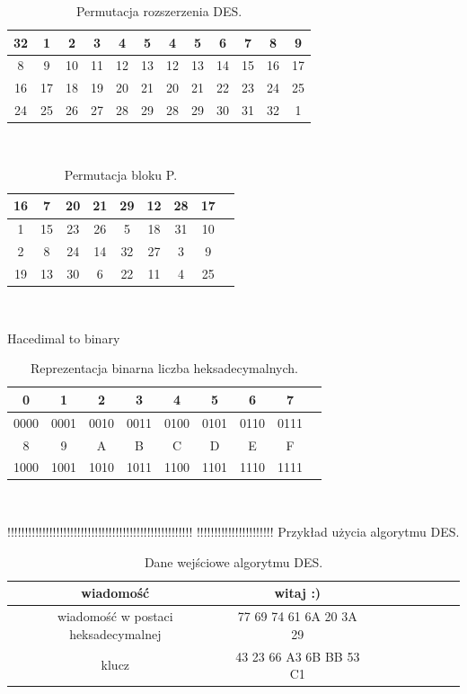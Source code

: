 \documentclass[12p]{article}
\begin{document}
\begin{table}[!h]
\centering
\begin{tabular}{|c|c|c|c|c|c|c|c|c|c|c|c|}
\hline
32 & 1 & 2 & 3 & 4 & 5 & 4 & 5 & 6 & 7 & 8 & 9\\
\hline
8 & 9 & 10 & 11 & 12 & 13 & 12 & 13 & 14 & 15 & 16 & 17\\
\hline
16 & 17 & 18 & 19 & 20 & 21 & 20 & 21 & 22 & 23 & 24 & 25\\
\hline
24 & 25 & 26 & 27 & 28 & 29 & 28 & 29 & 30 & 31 & 32 & 1\\
\hline
\end{tabular}
\caption{Permutacja rozszerzenia DES.}~\label{per_rozszerzenia}
\end{table}

\begin{table}[!h]
\centering
\begin{tabular}{|c|c|c|c|c|c|c|c|c|}
\hline
16 &	7 &	20& 	21& 	29& 	12& 	28& 	17\\ \hline
1 &	15& 	23& 	26& 	5& 	18& 	31& 	10\\ \hline
2 &	8 &	24 &	14& 	32& 	27& 	3 &	9\\ \hline
19 	&13 &	30& 	6& 	22& 	11& 	4& 	25\\ \hline
\end{tabular}
\caption{Permutacja bloku P.}~\label{blok_P}
\end{table}

Hacedimal to binary

\begin{table}[!h]
\centering
\begin{tabular}{|c|c|c|c|c|c|c|c|c|}
\hline
0 & 1 & 2 & 3 & 4 & 5 & 6 & 7\\
\hline
0000 & 0001 & 0010 & 0011 & 0100 & 0101 & 0110 & 0111\\
\hline
8 & 9 & A & B & C & D & E & F\\
\hline
1000 & 1001 & 1010 & 1011 & 1100 & 1101 & 1110 & 1111\\
\hline
\end{tabular}
\caption{Reprezentacja binarna liczba heksadecymalnych.}~\label{binary}
\end{table}



!!!!!!!!!!!!!!!!!!!!!!!!!!!!!!!!!!!!!!!!!!!!!!!!!!!!!
!!!!!!!!!!!!!!!!!!!!!!  Przykład użycia algorytmu DES.
 
\begin{table}[!h]
\centering
\begin{tabular}{|c|c|c|c|c|c|c|c|c|}
\hline
wiadomość & witaj :)\\
\hline
wiadomość w postaci heksadecymalnej & 77 69 74 61 6A 20 3A 29\\
\hline
klucz & 43 23 66 A3 6B BB 53 C1\\
\hline
\end{tabular}
\caption{Dane wejściowe algorytmu DES.}~\label{binary}
\end{table}
\end{document}
